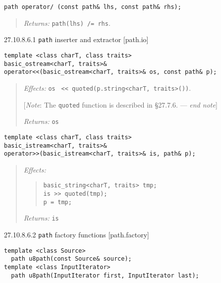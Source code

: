 \begin{verbatim}
path operator/ (const path& lhs, const path& rhs);
\end{verbatim}

\begin{quote}
\emph{Returns:} \texttt{path(lhs)\ /=\ rhs}.
\end{quote}

27.10.8.6.1 \texttt{path} inserter and extractor {[}path.io{]}

\begin{verbatim}
template <class charT, class traits>
basic_ostream<charT, traits>&
operator<<(basic_ostream<charT, traits>& os, const path& p);
\end{verbatim}

\begin{quote}
\emph{Effects:} \texttt{os\ }
\texttt{\textless{}\textless{}\ quoted(p.string\textless{}charT,\ traits\textgreater{}())}.

{[}\emph{Note}: The \texttt{quoted} function is described in §27.7.6.
--- \emph{end note}{]}

\emph{Returns:} \texttt{os}
\end{quote}

\begin{verbatim}
template <class charT, class traits>
basic_istream<charT, traits>&
operator>>(basic_istream<charT, traits>& is, path& p);
\end{verbatim}

\begin{quote}
\emph{Effects:~}

\begin{quote}
\begin{verbatim}
basic_string<charT, traits> tmp;
is >> quoted(tmp);
p = tmp;
\end{verbatim}
\end{quote}

\emph{Returns:} \texttt{is}
\end{quote}

27.10.8.6.2 \texttt{path} factory functions {[}path.factory{]}

\begin{verbatim}
template <class Source>  
  path u8path(const Source& source);
template <class InputIterator>
  path u8path(InputIterator first, InputIterator last);
\end{verbatim}

